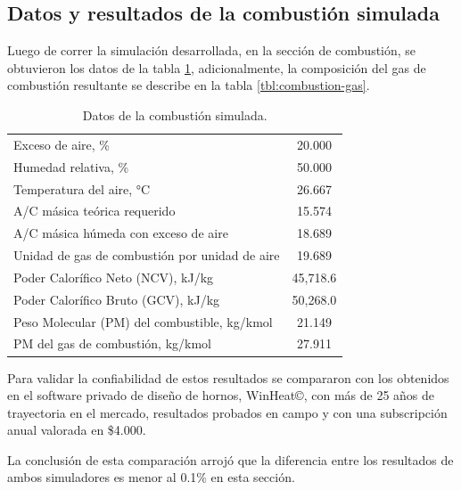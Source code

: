 \subsection{Datos y resultados de la combustión simulada}
\par Luego de correr la simulación desarrollada, en la sección de combustión, se obtuvieron los datos de la tabla \ref{tbl:combustion-data}, adicionalmente, la composición del gas de combustión resultante se describe en la tabla \ref{tbl:combustion-gas}.

\begin{table}
\begin{center}
\caption[Datos de la combustión]{Datos de la combustión simulada.}
\label{tbl:combustion-data}
\begin{tabular}{l|c}
	Exceso de aire, \%								& 20.000 \\
	Humedad relativa, \%							& 50.000 \\
	Temperatura del aire, °C						& 26.667 \\
	A/C másica teórica requerido					& 15.574 \\
	A/C másica húmeda con exceso de aire			& 18.689 \\
	Unidad de gas de combustión por unidad de aire  & 19.689 \\
	Poder Calorífico Neto  (NCV), kJ/kg				& 45,718.6 \\
	Poder Calorífico Bruto (GCV), kJ/kg				& 50,268.0 \\
	Peso Molecular (PM) del combustible, kg/kmol	& 21.149 \\
	PM del gas de combustión, kg/kmol				& 27.911 \\
\end{tabular}
\end{center}
\end{table}

\par Para validar la confiabilidad de estos resultados se compararon con los obtenidos en el software privado de diseño de hornos, WinHeat\copyright, con más de 25 años de trayectoria en el mercado, resultados probados en campo y con una subscripción anual valorada en \$4.000.

\par La conclusión de esta comparación arrojó que la diferencia entre los resultados de ambos simuladores es menor al 0.1\% en esta sección.

